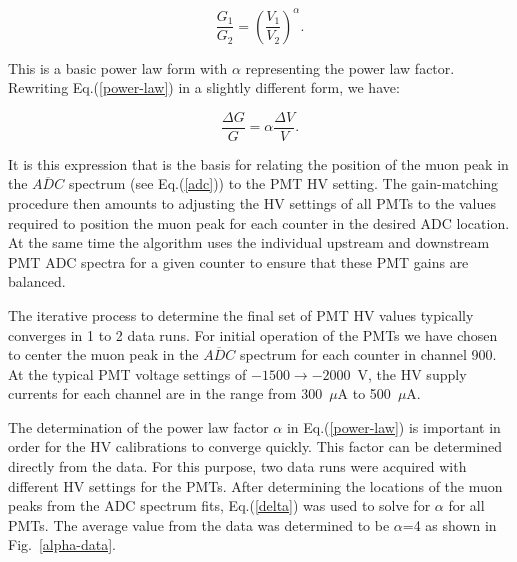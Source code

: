 \documentclass{elsart}
\begin{document}
\begin{equation}
\label{power-law}
\frac{G_1}{G_2} = \left( \frac{V_1}{V_2} \right) ^\alpha.
\end{equation}

\noindent
This is a basic power law form with $\alpha$ representing the power law factor. Rewriting
Eq.(\ref{power-law}) in a slightly different form, we have:

\begin{equation}
\label{delta}
\frac{\Delta G}{G} = \alpha \frac{\Delta V}{V}.
\end{equation}

It is this expression that is the basis for relating the position of the muon peak in the $\overline{ADC}$
spectrum (see Eq.(\ref{adc})) to the PMT HV setting. The gain-matching procedure then amounts to
adjusting the HV settings of all PMTs to the values required to position the muon peak for each counter
in the desired ADC location. At the same time the algorithm uses the individual upstream and downstream
PMT ADC spectra for a given counter to ensure that these PMT gains are balanced.

The iterative process to determine the final set of PMT HV values typically converges in 1 to 2 data runs.
For initial operation of the PMTs we have chosen to center the muon peak in the $\overline{ADC}$ spectrum
for each counter in channel 900. At the typical PMT voltage settings of $-1500 \to -2000$~V, the HV supply
currents for each channel are in the range from 300~$\mu$A to 500~$\mu$A. 

The determination of the power law factor $\alpha$ in Eq.(\ref{power-law}) is important in order for the
HV calibrations to converge quickly. This factor can be determined directly from the data. For this purpose,
two data runs were acquired with different HV settings for the PMTs. After determining the locations of
the muon peaks from the ADC spectrum fits, Eq.(\ref{delta}) was used to solve for $\alpha$ for all PMTs.
The average value from the data was determined to be $\alpha$=4 as shown in Fig.~\ref{alpha-data}.
\end{document}
